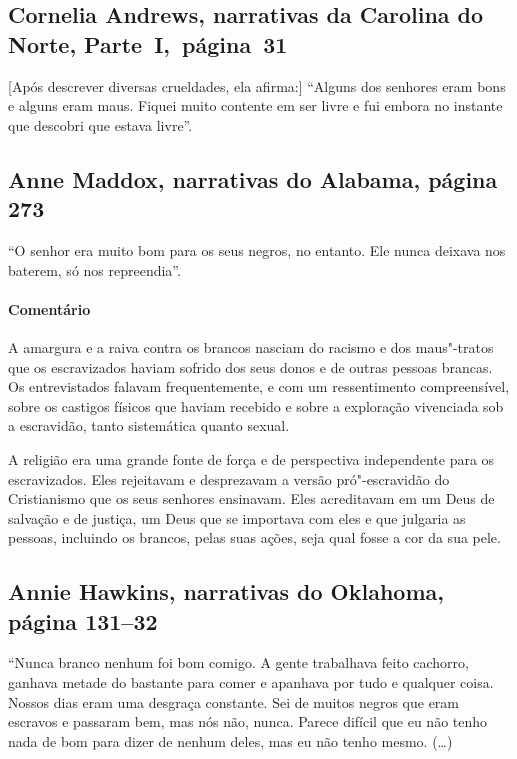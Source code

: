 \subsection{Cornelia Andrews, narrativas da Carolina do Norte, Parte~I,~página~31} \label{ref09}

{[}Após descrever diversas crueldades, ela afirma:{]} ``Alguns dos
senhores eram bons e alguns eram maus. Fiquei muito contente em ser
livre e fui embora no instante que descobri que estava livre''.

\subsection{Anne Maddox, narrativas do Alabama, página 273}
\label{ref180}

``O senhor era muito bom para os seus negros, no entanto. Ele nunca
deixava nos baterem, só nos repreendia''.

\paragraph{Comentário}\quad
{\small
A amargura e a raiva contra os brancos nasciam do racismo e dos
maus"-tratos que os escravizados haviam sofrido dos seus donos e de outras
pessoas brancas. Os entrevistados falavam frequentemente, e com um
ressentimento compreensível, sobre os castigos físicos que haviam
recebido e sobre a exploração vivenciada sob a escravidão, tanto
sistemática quanto sexual.

A religião era uma grande fonte de força e de perspectiva
independente para os escravizados. Eles rejeitavam e desprezavam a versão
pró"-escravidão do Cristianismo que os seus senhores ensinavam. Eles
acreditavam em um Deus de salvação e de justiça, um Deus que se
importava com eles e que julgaria as pessoas, incluindo os brancos,
pelas suas ações, seja qual fosse a cor da sua pele.
}

\subsection{Annie Hawkins, narrativas do Oklahoma, página 131--32} \label{ref123}

``Nunca branco nenhum foi bom comigo. A gente trabalhava feito cachorro,
ganhava metade do bastante para comer e apanhava por tudo e qualquer
coisa. Nossos dias eram uma desgraça constante. Sei de muitos negros que
eram escravos e passaram bem, mas nós não, nunca. Parece difícil que eu
não tenho nada de bom para dizer de nenhum deles, mas eu não tenho
mesmo. (\ldots{})

